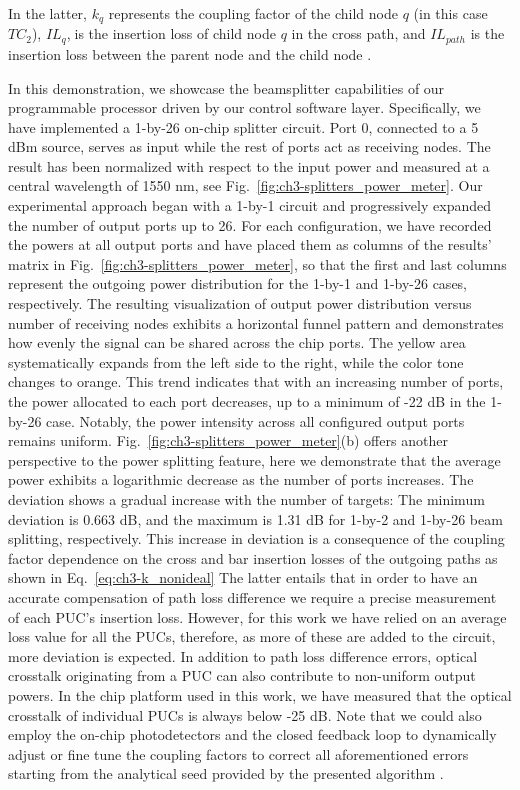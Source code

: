 In the latter, \(k_q\) represents the coupling factor of the child node $q$ (in this case $TC_2$), \(IL_q\), is the insertion loss of child node $q$ in the cross path, and \(IL_{path}\) is the insertion loss between the parent node and the child node \cite{perez-lopez_programmable_2018}.

In this demonstration, we showcase the beamsplitter capabilities of our programmable processor driven by our control software layer.
Specifically, we have implemented a 1-by-26 on-chip splitter circuit.
Port 0, connected to a 5 dBm source, serves as input while the rest of ports act as receiving nodes.
The result has been normalized with respect to the input power and measured at a central wavelength of 1550 nm, see Fig.~\ref{fig:ch3-splitters_power_meter}.
Our experimental approach began with a 1-by-1 circuit and progressively expanded the number of output ports up to 26.
For each configuration, we have recorded the powers at all output ports and have placed them as columns of the results' matrix in Fig.~\ref{fig:ch3-splitters_power_meter}, so that the first and last columns represent the outgoing power distribution for the 1-by-1 and 1-by-26 cases, respectively.
The resulting visualization of output power distribution versus number of receiving nodes exhibits a horizontal funnel pattern and demonstrates how evenly the signal can be shared across the chip ports.
The yellow area systematically expands from the left side to the right, while the color tone changes to orange.
This trend indicates that with an increasing number of ports, the power allocated to each port decreases, up to a minimum of -22 dB in the 1-by-26 case.
Notably, the power intensity across all configured output ports remains uniform.
Fig.~\ref{fig:ch3-splitters_power_meter}(b) offers another perspective to the power splitting feature, here we demonstrate that the average power exhibits a logarithmic decrease as the number of ports increases.
The deviation shows a gradual increase with the number of targets: The minimum deviation is 0.663 dB, and the maximum is 1.31 dB for 1-by-2 and 1-by-26 beam splitting, respectively.
This increase in deviation is a consequence of the coupling factor dependence on the cross and bar insertion losses of the outgoing paths as shown in Eq.~\eqref{eq:ch3-k_nonideal} The latter entails that in order to have an accurate compensation of path loss difference we require a precise measurement of each PUC’s insertion loss.
However, for this work we have relied on an average loss value for all the PUCs, therefore, as more of these are added to the circuit, more deviation is expected.
In addition to path loss difference errors, optical crosstalk originating from a PUC can also contribute to non-uniform output powers.
In the chip platform used in this work, we have measured that the optical crosstalk of individual PUCs is always below -25 dB.
Note that we could also employ the on-chip photodetectors and the closed feedback loop to dynamically adjust or fine tune the coupling factors to correct all aforementioned errors starting from the analytical seed provided by the presented algorithm \cite{perez-lopez_multipurpose_2020}.

